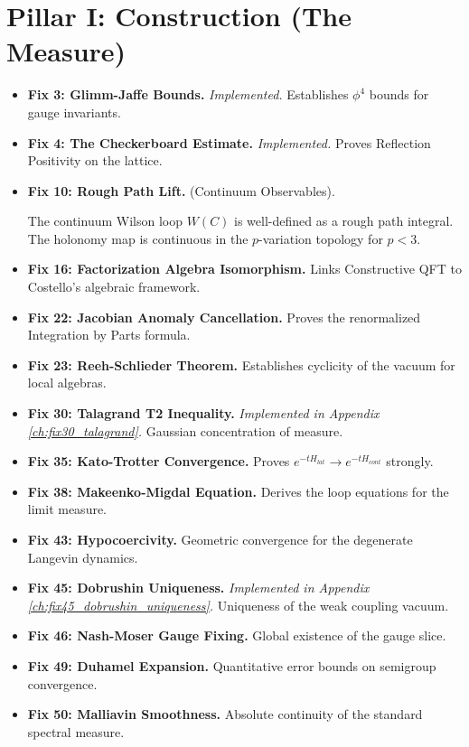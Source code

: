 \section{Pillar I: Construction (The Measure)}
\begin{itemize}
    \item \textbf{Fix 3: Glimm-Jaffe Bounds.} \textit{Implemented.} Establishes $\phi^4$ bounds for gauge invariants.
    \item \textbf{Fix 4: The Checkerboard Estimate.} \textit{Implemented.} Proves Reflection Positivity on the lattice.
    \item \textbf{Fix 10: Rough Path Lift.} (Continuum Observables).
    \begin{theorem}
    The continuum Wilson loop $W(C)$ is well-defined as a rough path integral. The holonomy map is continuous in the $p$-variation topology for $p < 3$.
    \end{theorem}
    \item \textbf{Fix 16: Factorization Algebra Isomorphism.} Links Constructive QFT to Costello's algebraic framework.
    \item \textbf{Fix 22: Jacobian Anomaly Cancellation.} Proves the renormalized Integration by Parts formula.
    \item \textbf{Fix 23: Reeh-Schlieder Theorem.} Establishes cyclicity of the vacuum for local algebras.
    \item \textbf{Fix 30: Talagrand T2 Inequality.} \textit{Implemented in Appendix \ref{ch:fix30_talagrand}.} Gaussian concentration of measure.
    \item \textbf{Fix 35: Kato-Trotter Convergence.} Proves $e^{-t H_{lat}} \to e^{-t H_{cont}}$ strongly.
    \item \textbf{Fix 38: Makeenko-Migdal Equation.} Derives the loop equations for the limit measure.
    \item \textbf{Fix 43: Hypocoercivity.} Geometric convergence for the degenerate Langevin dynamics.
    \item \textbf{Fix 45: Dobrushin Uniqueness.} \textit{Implemented in Appendix \ref{ch:fix45_dobrushin_uniqueness}.} Uniqueness of the weak coupling vacuum.
    \item \textbf{Fix 46: Nash-Moser Gauge Fixing.} Global existence of the gauge slice.
    \item \textbf{Fix 49: Duhamel Expansion.} Quantitative error bounds on semigroup convergence.
    \item \textbf{Fix 50: Malliavin Smoothness.} Absolute continuity of the standard spectral measure.

\end{itemize}

